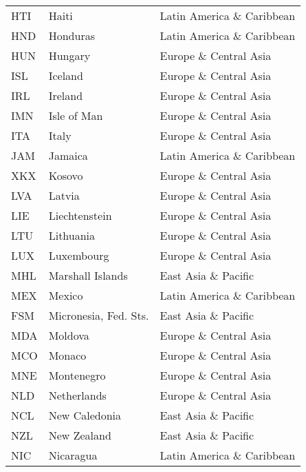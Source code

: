 \documentclass[../main.tex]{subfiles}
\begin{document}
\begin{center}
\begin{longtable}[H]{lll}
HTI       & Haiti                          & Latin America \& Caribbean \\
HND       & Honduras                       & Latin America \& Caribbean \\
HUN       & Hungary                        & Europe \& Central Asia     \\
ISL       & Iceland                        & Europe \& Central Asia     \\
IRL       & Ireland                        & Europe \& Central Asia     \\
IMN       & Isle of Man                    & Europe \& Central Asia     \\
ITA       & Italy                          & Europe \& Central Asia     \\
JAM       & Jamaica                        & Latin America \& Caribbean \\
XKX       & Kosovo                         & Europe \& Central Asia     \\
LVA       & Latvia                         & Europe \& Central Asia     \\
LIE       & Liechtenstein                  & Europe \& Central Asia     \\
LTU       & Lithuania                      & Europe \& Central Asia     \\
LUX       & Luxembourg                     & Europe \& Central Asia     \\
MHL       & Marshall Islands               & East Asia \& Pacific       \\
MEX       & Mexico                         & Latin America \& Caribbean \\
FSM       & Micronesia, Fed. Sts.          & East Asia \& Pacific       \\
MDA       & Moldova                        & Europe \& Central Asia     \\
MCO       & Monaco                         & Europe \& Central Asia     \\
MNE       & Montenegro                     & Europe \& Central Asia     \\
NLD       & Netherlands                    & Europe \& Central Asia     \\
NCL       & New Caledonia                  & East Asia \& Pacific       \\
NZL       & New Zealand                    & East Asia \& Pacific       \\
NIC       & Nicaragua                      & Latin America \& Caribbean \\

\end{longtable}
\end{center}
\end{document}

